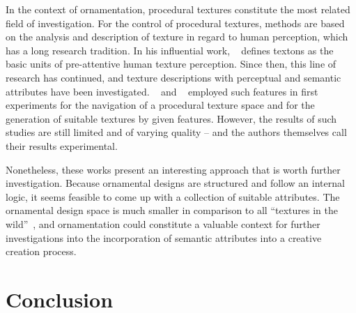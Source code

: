 In the context of ornamentation, procedural textures constitute the most related field of investigation. For the control of procedural textures, methods are based on the analysis and description of texture in regard to human perception, which has a long research tradition. In his influential work, \citeauthor*{julesz_1981_tte}~\cite{julesz_1981_tte} defines textons as the basic units of pre-attentive human texture perception. Since then, this line of research has continued, and texture descriptions with perceptual \cite{liu_2015_vpp} and semantic~\cite{matthews_2013_eta,cimpoi_2014_dtw} attributes have been investigated. \citeauthor*{dong_2017_ptg}~\cite{dong_2017_ptg} and \citeauthor*{liu_2018_ppt}~\cite{liu_2018_ppt} employed such features in first experiments for the navigation of a procedural texture space and for the generation of suitable textures by given features. %
However, the results of such studies are still limited and of varying quality – and the authors themselves \cite{liu_2018_ppt} call their results experimental.

Nonetheless, these works present an interesting approach that is worth further investigation. Because ornamental designs are structured and follow an internal logic, it seems feasible to come up with a collection of suitable attributes. The ornamental design space is much smaller in comparison to all ``textures in the wild''~\cite{cimpoi_2014_dtw}, and ornamentation could constitute a valuable context for further investigations into the incorporation of semantic attributes into a creative creation process.










\section{Conclusion}
\label{sec:analysis_summary}

